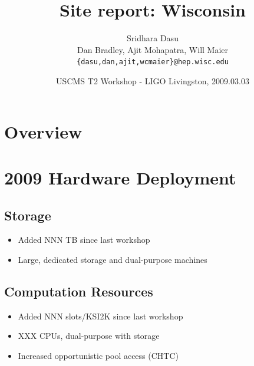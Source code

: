 \documentclass{beamer}
\title{Site report: Wisconsin}
\author[Maier]{
    Sridhara Dasu \\
    Dan Bradley, Ajit Mohapatra, Will Maier
    {\tt \{dasu,dan,ajit,wcmaier\}@hep.wisc.edu}}
\institute[Wisconsin]{University of Wisconsin - High Energy Physics}
\date[2009.03.03]{USCMS T2 Workshop - LIGO Livingston, 2009.03.03}
\begin{document}

\begin{frame}
    \titlepage
\end{frame}

\section{Overview}
\begin{frame}
    \tableofcontents
\end{frame}

\section{2009 Hardware Deployment}
\subsection{Storage}
\begin{frame}
\begin{itemize}
    \item Added NNN TB since last workshop
    \item Large, dedicated storage and dual-purpose machines
\end{itemize}
\end{frame}

\subsection{Computation Resources}
\begin{frame}
\begin{itemize}
    \item Added NNN slots/KSI2K since last workshop
    \item XXX CPUs, dual-purpose with storage
    \item Increased opportunistic pool access (CHTC)
\end{itemize}
\end{frame}
\end{document}

